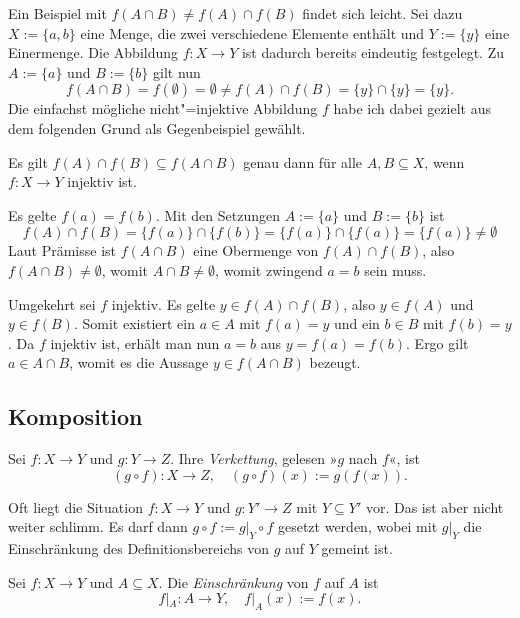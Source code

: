 \noindent
Ein Beispiel mit $f(A\cap B)\ne f(A)\cap f(B)$ findet sich leicht.
Sei dazu $X:=\{a,b\}$ eine Menge, die zwei verschiedene Elemente
enthält und $Y:=\{y\}$ eine Einermenge. Die Abbildung $f\colon X\to Y$
ist dadurch bereits eindeutig festgelegt. Zu $A:=\{a\}$ und $B:=\{b\}$
gilt nun
\[f(A\cap B) = f(\emptyset) = \emptyset \ne f(A)\cap f(B) = \{y\}\cap\{y\} = \{y\}.\]
Die einfachst mögliche nicht"=injektive Abbildung $f$ habe ich dabei
gezielt aus dem folgenden Grund als Gegenbeispiel gewählt.

\begin{Satz}
Es gilt $f(A)\cap f(B)\subseteq f(A\cap B)$ genau dann für alle $A,B\subseteq X$,
wenn $f\colon X\to Y$ injektiv ist.
\end{Satz}
\begin{Beweis}
Es gelte $f(a)=f(b)$. Mit den Setzungen $A:=\{a\}$ und $B:=\{b\}$ ist
\[f(A)\cap f(B) = \{f(a)\}\cap\{f(b)\} = \{f(a)\}\cap\{f(a)\} = \{f(a)\}\ne\emptyset\]
Laut Prämisse ist $f(A\cap B)$ eine Obermenge von $f(A)\cap f(B)$,
also $f(A\cap B)\ne\emptyset$, womit $A\cap B\ne\emptyset$, womit
zwingend $a=b$ sein muss.

Umgekehrt sei $f$ injektiv. Es gelte $y\in f(A)\cap f(B)$, also
$y\in f(A)$ und $y\in f(B)$. Somit existiert ein $a\in A$ mit
$f(a)=y$ und ein $b\in B$ mit $f(b)=y$. Da $f$ injektiv ist,
erhält man nun $a=b$ aus $y=f(a)=f(b)$. Ergo gilt $a\in A\cap B$,
womit es die Aussage $y\in f(A\cap B)$ bezeugt.\,\qedsymbol
\end{Beweis}

\subsection{Komposition}

\begin{Definition}[Komposition]\newlinefirst
Sei $f\colon X\to Y$ und $g\colon Y\to Z$. Ihre
\emph{Verkettung},
gelesen »$g$ nach $f$«, ist%
\[(g\circ f)\colon X\to Z,\quad (g\circ f)(x):=g(f(x)).\]
\end{Definition}

\noindent
Oft liegt die Situation $f\colon X\to Y$ und $g\colon Y'\to Z$
mit $Y\subseteq Y'$ vor. Das ist aber nicht weiter schlimm. Es
darf dann $g\circ f := g|_Y\circ f$ gesetzt werden, wobei mit $g|_Y$ die
Einschränkung des Definitionsbereichs von $g$ auf $Y$ gemeint ist.

\begin{Definition}[Einschränkung]%
\newlinefirst
Sei $f\colon X\to Y$ und $A\subseteq X$. Die \emph{Einschränkung} von
$f$ auf $A$ ist%
\[f|_A\colon A\to Y,\quad f|_A(x):=f(x).\]
\end{Definition}

